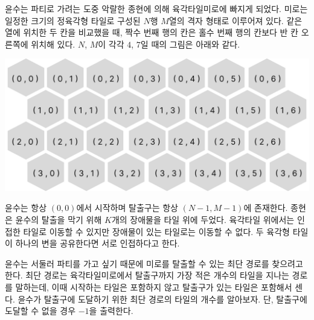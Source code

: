윤수는 파티로 가려는 도중 악랄한 종현에 의해 육각타일미로에 빠지게 되었다. 미로는 일정한 크기의 정육각형 타일로 구성된 $N$행 $M$열의 격자 형태로 이루어져 있다. 같은 열에 위치한 두 칸을 비교했을 때, 짝수 번째 행의 칸은 홀수 번째 행의 칸보다 반 칸 오른쪽에 위치해 있다. $N$, $M$이 각각 $4$, $7$일 때의 그림은 아래와 같다.
\begin{center}
\includegraphics[bb=0 0 100 200]{Group1.png}
\end{center} 

윤수는 항상 $(0,0)$에서 시작하며 탈출구는 항상 $(N-1, M-1)$에 존재한다. 종현은 윤수의 탈출을 막기 위해 $K$개의 장애물을 타일 위에 두었다. 육각타일 위에서는 인접한 타일로 이동할 수 있지만 장애물이 있는 타일로는 이동할 수 없다. 두 육각형 타일이 하나의 변을 공유한다면 서로 인접하다고 한다.  

윤수는 서둘러 파티를 가고 싶기 때문에 미로를 탈출할 수 있는 최단 경로를 찾으려고 한다. 최단 경로는 육각타일미로에서 탈출구까지 가장 적은 개수의 타일을 지나는 경로를 말하는데, 이때 시작하는 타일은 포함하지 않고 탈출구가 있는 타일은 포함해서 센다. 윤수가 탈출구에 도달하기 위한 최단 경로의 타일의 개수를 알아보자. 단, 탈출구에 도달할 수 없을 경우 $-1$을 출력한다. 
